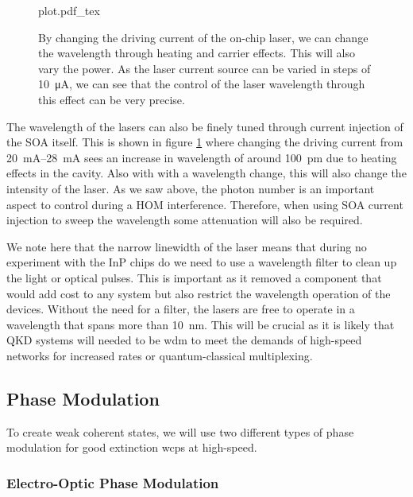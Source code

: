 \begin{figure}[tp]
	\centering
	\small	
	\def\svgwidth{\textwidth} 
	{plot.pdf_tex}
	\caption[Laser wavelength current-injection sweep]{By changing the driving current of the on-chip laser, we can change the wavelength through heating and carrier effects. This will also vary the power. As the laser current source can be varied in steps of \SI{10}{\uA}, we can see that the control of the laser wavelength through this effect can be very precise.}
	\label{fig:curr_sweep}
\end{figure}

The wavelength of the lasers can also be finely tuned through current injection of the \ac{SOA} itself. This is shown in figure \ref{fig:curr_sweep} where changing the driving current from \SIrange{20}{28}{mA} sees an increase in wavelength of around \SI{100}{pm} due to heating effects in the cavity. Also with with a wavelength change, this will also change the intensity of the laser. As we saw above, the photon number is an important aspect to control during a \ac{HOM} interference. Therefore, when using \ac{SOA} current injection to sweep the wavelength some attenuation will also be required. 

We note here that the narrow linewidth of the laser means that during no experiment with the \ac{InP} chips do we need to use a wavelength filter to clean up the light or optical pulses. This is important as it removed a component that would add cost to any system but also restrict the wavelength operation of the devices. Without the need for a filter, the lasers are free to operate in a wavelength that spans more than \SI{10}{nm}. This will be crucial as it is likely that \ac{QKD} systems will needed to be \ac{wdm} to meet the demands of high-speed networks for increased rates or quantum-classical multiplexing.

\subsection{Phase Modulation}

To create weak coherent states, we will use two different types of phase modulation for good extinction \acp{wcp} at high-speed. 

\subsubsection{Electro-Optic Phase Modulation}

